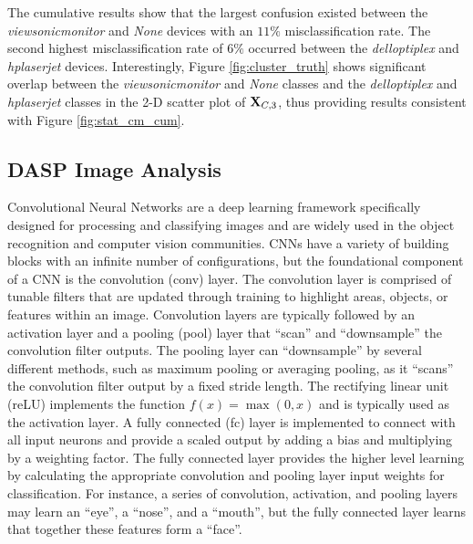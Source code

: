 The cumulative results show that the largest confusion existed between the \textit{viewsonicmonitor} and \textit{None} devices with an $11\%$ misclassification rate.  The second highest misclassification rate of $6\%$ occurred between the \textit{delloptiplex} and \textit{hplaserjet} devices.  Interestingly, Figure \ref{fig:cluster_truth} shows significant overlap between the \textit{viewsonicmonitor} and \textit{None} classes and the \textit{delloptiplex} and \textit{hplaserjet} classes in the 2-D scatter plot of $\textit{\bf{X}}_{C,3}$, thus providing results consistent with Figure \ref{fig:stat_cm_cum}.

\subsection[DASP Image Analysis]{DASP Image Analysis}
\label{Convolutional Neural Network Single Device Classification}

Convolutional Neural Networks are a deep learning framework specifically designed for processing and classifying images and are widely used in the object recognition and computer vision communities.  CNNs have a variety of building blocks with an infinite number of configurations, but the foundational component of a CNN is the convolution (conv) layer.  The convolution layer is comprised of tunable filters that are updated through training to highlight areas, objects, or features within an image.  Convolution layers are typically followed by an activation layer and a pooling (pool) layer that ``scan'' and ``downsample'' the convolution filter outputs.  The pooling layer can ``downsample'' by several different methods, such as maximum pooling or averaging pooling, as it ``scans'' the convolution filter output by a fixed stride length.  The rectifying linear unit (reLU) implements the function $f(x) = \max(0,x)$ and is typically used as the activation layer.  A fully connected (fc) layer is implemented to connect with all input neurons and provide a scaled output by adding a bias and multiplying by a weighting factor.  The fully connected layer provides the higher level learning by calculating the appropriate convolution and pooling layer input weights for classification.   For instance, a series of convolution, activation, and pooling layers may learn an ``eye'', a ``nose'', and a ``mouth'', but the fully connected layer learns that together these features form a ``face''. 

